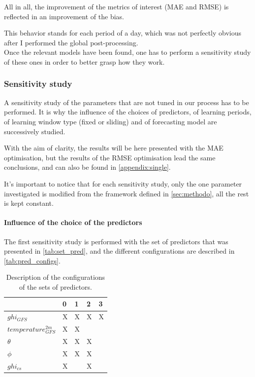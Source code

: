 All in all, the improvement of the metrics of interest (MAE and RMSE) is reflected in an improvement of the bias. 

This behavior stands for each period of a day, which was not perfectly obvious after I performed the global post-processing.\\

Once the relevant models have been found, one has to perform a sensitivity study of these ones in order to better grasp how they work.

\subsubsection{Sensitivity study}
A sensitivity study of the parameters that are not tuned in our process has to be performed. It is why the influence of the choices of predictors, of learning periods, of learning window type (fixed or sliding) and of forecasting model are successively studied. 

With the aim of clarity, the results will be here presented with the MAE optimisation, but the results of the RMSE optimisation lead the same conclusions, and can also
be found in \autoref{appendix:single}.

It's important to notice that for each sensitivity study, only the one parameter investigated is modified from the framework defined in \autoref{sec:methodo}, all the rest is kept constant.

\paragraph{Influence of the choice of the predictors}
\indent

The first sensitivity study is performed with the set of predictors that was presented in \autoref{tab:set_pred}, and the different configurations are described in \autoref{tab:pred_configs}.
\begin{table}[htb!]
\begin{center}
\begin{tabular}{|l|llll|}
\toprule
{} &  0 &  1 &  2 &  3 \\
\midrule
$ghi_{GFS}$            &  X &  X &  X &  X \\
$temperature^{2m}_{GFS}$ &  X &  X &    &    \\
$\theta$             &  X &  X &  X &    \\
$\phi$            &  X &  X &  X &    \\
$ghi_{cs}$             &  X &    &  X &    \\
\bottomrule
\end{tabular}
\end{center}
\label{tab:pred_configs}
\caption{Description of the configurations of the sets of predictors.}
\end{table}

